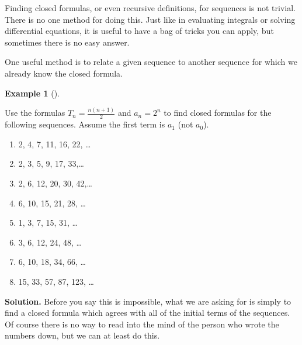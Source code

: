 \documentclass[10pt,]{book}
\theoremstyle{plain}
\theoremstyle{definition}
\newtheorem{example}[theorem]{Example}
\theoremstyle{definition}
\theoremstyle{definition}
\numberwithin{equation}{chapter}
\begin{document}
    Finding closed formulas, or even recursive definitions, for sequences is not trivial. There is no one method for doing this. Just like in evaluating integrals or solving differential equations, it is useful to have a bag of tricks you can apply, but sometimes there is no easy answer.
\par

    One useful method is to relate a given sequence to another sequence for which we already know the closed formula.
\begin{example}[]\label{example-60}

        Use the formulas \(T_n = \frac{n(n+1)}{2}\) and \(a_n = 2^n\) to find closed formulas for the following sequences. Assume the first term is \(a_1\) (not \(a_0\)).
      \leavevmode%
\begin{enumerate}
\item\hypertarget{li-836}{}
            2, 4, 7, 11, 16, 22, \dots{}
\item\hypertarget{li-837}{}
            2, 3, 5, 9, 17, 33,\dots{}
\item\hypertarget{li-838}{}
            2, 6, 12, 20, 30, 42,\dots{}
\item\hypertarget{li-839}{}
            6, 10, 15, 21, 28, \dots{}
\item\hypertarget{li-840}{}
            1, 3, 7, 15, 31, \dots{}
\item\hypertarget{li-841}{}
            3, 6, 12, 24, 48, \dots{}
\item\hypertarget{li-842}{}
            6, 10, 18, 34, 66, \dots{}
\item\hypertarget{li-843}{}
            15, 33, 57, 87, 123, \dots{}
\end{enumerate}

\par\medskip\noindent%
\textbf{Solution.}\quad
        Before you say this is impossible, what we are asking for is simply to find a closed formula which agrees with all of the initial terms of the sequences. Of course there is no way to read into the mind of the person who wrote the numbers down, but we can at least do this.
\par


\end{example}
\end{document}
